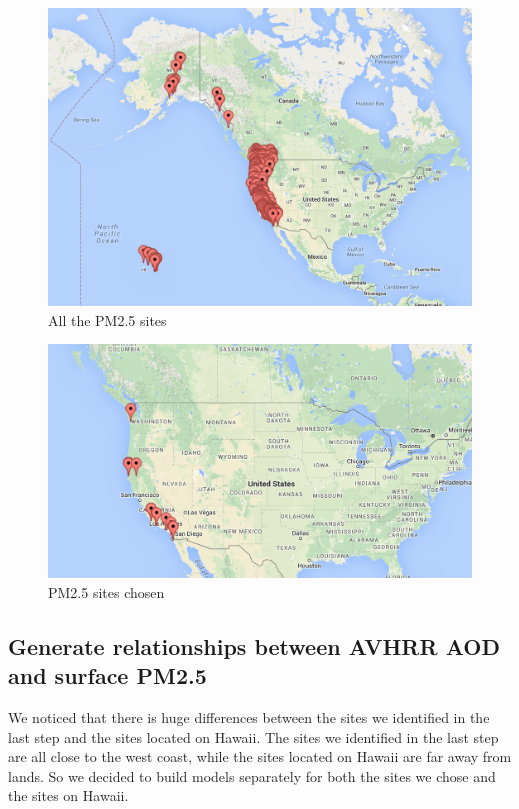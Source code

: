 \documentclass[12pt]{article}
\begin{document}
\begin{figure}[!h]
\centering
\includegraphics[width=0.8\linewidth]{AllPMSites.png}
\caption{All the PM2.5 sites}
\label{fig3.1}
\end{figure}

\begin{figure}[!h]
\centering
\includegraphics[width=0.8\linewidth]{PMSites.png}
\caption{PM2.5 sites chosen}
\label{fig3.2}
\end{figure}


\subsection{Generate relationships between AVHRR AOD and surface PM2.5}
We noticed that there is huge differences between the sites we identified in the last step and the sites located on Hawaii. The sites we identified in the last step are all close to the west coast, while the sites located on Hawaii are far away from lands. So we decided to build models separately for both the sites we chose and the sites on Hawaii. 
\end{document}
